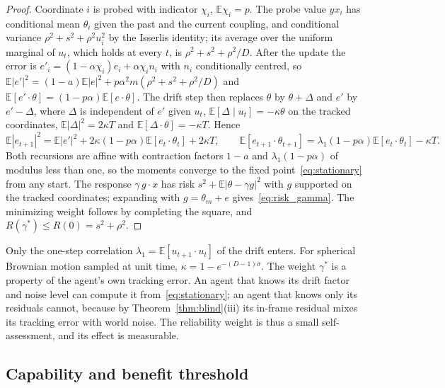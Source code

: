\documentclass[12pt]{article}
\theoremstyle{definition}
\newcommand{\E}{\mathbb E}
\begin{document}
\begin{proof}
Coordinate $i$ is probed with indicator $\chi_i$, $\E\chi_i=p$. The probe value $y x_i$ has conditional mean $\theta_i$ given the past and the current coupling, and conditional variance $\rho^2+s^2+\rho^2u_i^2$ by the Isserlis identity; its average over the uniform marginal of $u_t$, which holds at every $t$, is $\rho^2+s^2+\rho^2/D$. After the update the error is $e'_i=(1-\alpha\chi_i)e_i+\alpha\chi_in_i$ with $n_i$ conditionally centred, so $\E|e'|^2=(1-a)\E|e|^2+p\alpha^2m(\rho^2+s^2+\rho^2/D)$ and $\E[e'\cdot\theta]=(1-p\alpha)\E[e\cdot\theta]$. The drift step then replaces $\theta$ by $\theta+\Delta$ and $e'$ by $e'-\Delta$, where $\Delta$ is independent of $e'$ given $u_t$, $\E[\Delta\mid u_t]=-\kappa\theta$ on the tracked coordinates, $\E|\Delta|^2=2\kappa T$ and $\E[\Delta\cdot\theta]=-\kappa T$. Hence
\[
\E|e_{t+1}|^2=\E|e'|^2+2\kappa(1-p\alpha)\E[e_t\cdot\theta_t]+2\kappa T,\qquad
\E[e_{t+1}\cdot\theta_{t+1}]=\lambda_1(1-p\alpha)\E[e_t\cdot\theta_t]-\kappa T .
\]
Both recursions are affine with contraction factors $1-a$ and $\lambda_1(1-p\alpha)$ of modulus less than one, so the moments converge to the fixed point~\eqref{eq:stationary} from any start. The response $\gamma\,g\cdot x$ has risk $s^2+\E|\theta-\gamma g|^2$ with $g$ supported on the tracked coordinates; expanding with $g=\theta_m+e$ gives~\eqref{eq:risk_gamma}. The minimizing weight follows by completing the square, and $R(\gamma^*)\le R(0)=s^2+\rho^2$.
\end{proof}

Only the one-step correlation $\lambda_1=\E[u_{t+1}\cdot u_t]$ of the drift enters. For spherical Brownian motion sampled at unit time, $\kappa=1-e^{-(D-1)\sigma}$. The weight $\gamma^*$ is a property of the agent's own tracking error. An agent that knows its drift factor and noise level can compute it from~\eqref{eq:stationary}; an agent that knows only its residuals cannot, because by Theorem~\ref{thm:blind}(iii) its in-frame residual mixes its tracking error with world noise. The reliability weight is thus a small self-assessment, and its effect is measurable.

\subsection{Capability and benefit threshold}
\end{document}
